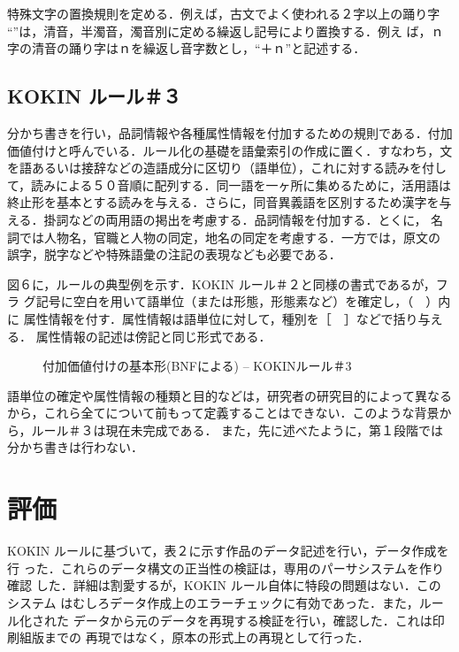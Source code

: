 特殊文字の置換規則を定める．例えば，古文でよく使われる２字以上の踊り字
“\odorizi”は，清音，半濁音，濁音別に定める繰返し記号により置換する．例え
ば，ｎ字の清音の踊り字はｎを繰返し音字数とし，“＋ｎ”と記述する．


\subsection{KOKIN ルール＃３}
\label{sec:4.4setu}

分かち書きを行い，品詞情報や各種属性情報を付加するための規則である．付加
価値付けと呼んでいる．ルール化の基礎を語彙索引の作成に置く．すなわち，文
を語あるいは接辞などの造語成分に区切り（語単位），これに対する読みを付し
て，読みによる５０音順に配列する．同一語を一ヶ所に集めるために，活用語は
終止形を基本とする読みを与える．さらに，同音異義語を区別するため漢字を与
える．掛詞\yougo などの両用語の掲出を考慮する．品詞情報を付加する．とくに，
名詞では人物名，官職と人物の同定，地名の同定を考慮する．一方では，原文の
誤字，脱字などや特殊語彙の注記の表現なども必要である．

図６に，ルールの典型例を示す．KOKIN ルール＃２と同様の書式であるが，フラ
グ記号に空白を用いて語単位（または形態，形態素など）を確定し，（　）内に
属性情報を付す．属性情報は語単位に対して，種別を［　］などで括り与える．
属性情報の記述は傍記と同じ形式である．

\begin{figure}[htbp]
  \begin{center}
    \leavevmode
    
\vspace*{5mm}
    \caption{付加価値付けの基本形(BNFによる) -- KOKINルール＃3}
    \label{fig:6}
  \end{center}
\end{figure}

語単位の確定や属性情報の種類と目的などは，研究者の研究目的によって異なる
から，これら全てについて前もって定義することはできない．このような背景か
ら，ルール＃３は現在未完成である．
また，先に述べたように，第１段階では分かち書きは行わない．


\section{評価}
\label{sec:5shou}

KOKIN ルールに基づいて，表２に示す作品のデータ記述を行い，データ作成を行
った．これらのデータ構文の正当性の検証は，専用のパーサシステムを作り確認
した．詳細は割愛するが，KOKIN ルール自体に特段の問題はない．このシステム
はむしろデータ作成上のエラーチェックに有効であった．また，ルール化された
データから元のデータを再現する検証を行い，確認した．これは印刷組版までの
再現ではなく，原本の形式上の再現として行った．

